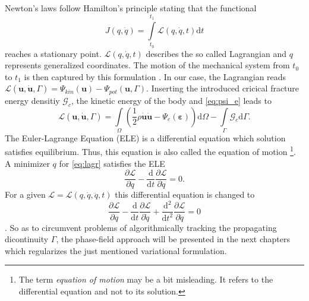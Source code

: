 Newton's laws follow Hamilton's principle stating that the functional 
\begin{equation} \label{eq:fctal_Hamilton}
	J\left(q,\dot{q}\right)=\int\limits_{t_{0}}^{t_{1}}\mathcal{L}\left(q,\dot{q},t\right)\mathrm{d}t
\end{equation} reaches a stationary point. $\mathcal{L}\left(q,\dot{q},t\right)$ describes the so called Lagrangian and $q$ represents generalized coordinates. The motion of the mechanical system from $t_{0}$ to $t_{1}$ is then captured by this formulation \citep{01_B_LagrMech}. In our case, the Lagrangian reads $\mathcal{L}\left(\mathbf{u},\dot{\mathbf{u}},\Gamma\right)=\Psi_{kin}\left(\mathbf{u}\right)-\Psi_{pot}\left(\mathbf{u},\Gamma\right)$. Inserting the introduced cricical fracture energy densitiy $\mathcal{G}_{c}$, the kinetic energy of the body and \eqref{eq:psi_e} leads to
\begin{equation} \label{eq:lagr}
	\mathcal{L}\left(\mathbf{u},\dot{\mathbf{u}},\Gamma\right) = \int\limits_{\Omega}\left(\frac{1}{2}\rho\dot{\mathbf{u}}\dot{\mathbf{u}}-\Psi_{e}\left(\bm{\varepsilon}\right)\right)\mathrm{d}\Omega - \int\limits_{\Gamma}\mathcal{G}_{c}\mathrm{d}\Gamma.
\end{equation}
The Euler-Lagrange Equation (ELE) is a differential equation which solution satisfies equilibrium. Thus, this equation is also called the equation of motion \footnote{The term \textit{equation of motion} may be a bit misleading. It refers to the differential equation and not to its solution.}. A minimizer $q$ for \eqref{eq:lagr} satisfies the ELE
\begin{equation} \label{eq:ELE_O2}
	\dfrac{\partial\mathcal{L}}{\partial q}-\dfrac{\mathrm{d}}{\mathrm{d}t}\dfrac{\partial\mathcal{L}}{\partial\dot{q}}=0.
\end{equation}
For a given $\mathcal{L}=\mathcal{L}\left(q,\dot{q},\ddot{q}, t\right)$ this differential equation is changed to
\begin{equation} \label{eq:ELE:_O4}
	\dfrac{\partial\mathcal{L}}{\partial q}-\dfrac{\mathrm{d}}{\mathrm{d}t}\dfrac{\partial\mathcal{L}}{\partial\dot{q}}+\dfrac{\mathrm{d}^{2}}{\mathrm{d}t^{2}}\dfrac{\partial\mathcal{L}}{\partial\ddot{q}}=0
\end{equation}
\citep{01_B_LagrMech}. So as to circumvent problems of algorithmically tracking the propagating dicontinuity $\Gamma$, the phase-field approach will be presented in the next chapters which regularizes the just mentioned variational formulation.

